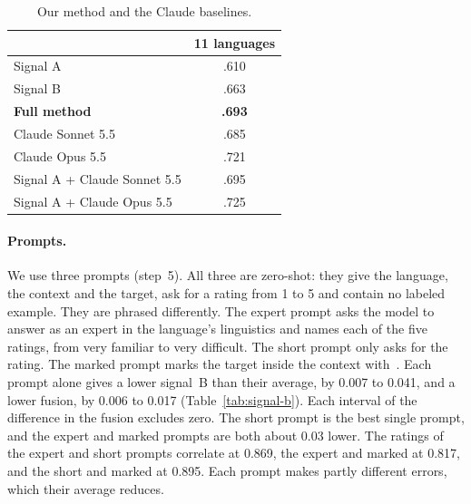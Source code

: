 \documentclass[11pt]{article}
\begin{document}
\begin{table}[t]
\centering
\small
\setlength{\tabcolsep}{4pt}
\begin{tabular}{lc}
\toprule
 & 11 languages \\
\midrule
Signal A                      & .610 \\ %
Signal B                      & .663 \\ %
\midrule
\textbf{Full method}          & \textbf{.693} \\ %
\midrule
Claude Sonnet 5.5             & .685 \\ %
Claude Opus 5.5               & .721 \\ %
\midrule
Signal A + Claude Sonnet 5.5  & .695 \\ %
Signal A + Claude Opus 5.5    & .725 \\ %
\bottomrule
\end{tabular}
\caption{Our method and the Claude baselines.}
\label{tab:ablations}
\end{table}


\paragraph{Prompts.} We use three prompts (step~5). All three are zero-shot: they give the %
language, the context and the target, ask for a rating from 1 to 5 and contain no labeled
example. They are phrased differently. The expert prompt asks the model to answer as an expert in
the language's linguistics and names each of the five ratings, from very familiar to very
difficult. The short prompt only asks for the rating. The marked prompt marks the target inside the
context with \guillemotleft\,\guillemotright. Each prompt alone gives a lower signal~B than their
average, by 0.007 to 0.041, and a lower fusion, by 0.006 to 0.017 (Table~\ref{tab:signal-b}). Each %
interval of the difference in the fusion excludes zero. The short prompt is the best single prompt, %
and the expert and marked prompts are both about 0.03 lower. The ratings of the expert and short %
prompts correlate at 0.869, the expert and marked at 0.817, and the short and marked at 0.895. %
Each prompt makes partly different errors, which their average reduces.
\end{document}

